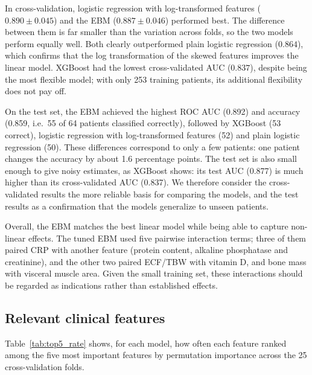 \documentclass[conference]{IEEEtran}
\begin{document}
In cross-validation, logistic regression with log-transformed features
($0.890 \pm 0.045$) and the EBM ($0.887 \pm 0.046$) performed best. The
difference between them is far smaller than the variation across folds, so the
two models perform equally well. Both clearly outperformed plain logistic
regression ($0.864$), which confirms that the log transformation of the skewed
features improves the linear model. XGBoost had the lowest cross-validated AUC
($0.837$), despite being the most flexible model; with only 253 training
patients, its additional flexibility does not pay off.

On the test set, the EBM achieved the highest ROC AUC (0.892) and accuracy
(0.859, i.e.\ 55 of 64 patients classified correctly), followed by XGBoost
(53 correct), logistic regression with log-transformed features (52) and plain
logistic regression (50). These differences correspond to only a few patients:
one patient changes the accuracy by about 1.6 percentage points. The test set
is also small enough to give noisy estimates, as XGBoost shows: its test AUC
(0.877) is much higher than its cross-validated AUC (0.837). We therefore
consider the cross-validated results the more reliable basis for comparing the
models, and the test results as a confirmation that the models generalize to
unseen patients.

Overall, the EBM matches the best linear model while being able to capture
non-linear effects. The tuned EBM used five pairwise interaction terms; three
of them paired CRP with another feature (protein content, alkaline phosphatase
and creatinine), and the other two paired ECF/TBW with vitamin D, and bone mass
with visceral muscle area. Given the small training set, these interactions
should be regarded as indications rather than established effects.

\subsection{Relevant clinical features}
\label{ssec:results_features}

Table~\ref{tab:top5_rate} shows, for each model, how often each feature ranked
among the five most important features by permutation importance across the
25 cross-validation folds.
\end{document}
